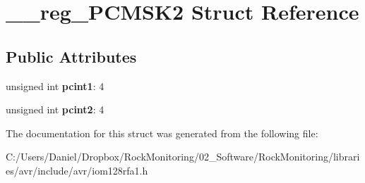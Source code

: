 \hypertarget{struct____reg___p_c_m_s_k2}{}\section{\+\_\+\+\_\+reg\+\_\+\+P\+C\+M\+S\+K2 Struct Reference}
\label{struct____reg___p_c_m_s_k2}
\subsection*{Public Attributes}
\begin{DoxyCompactItemize}
\item 
unsigned int {\bfseries pcint1}\+: 4\hypertarget{struct____reg___p_c_m_s_k2_a2aab5613925bbfc74c45b22c63a7af15}{}\label{struct____reg___p_c_m_s_k2_a2aab5613925bbfc74c45b22c63a7af15}

\item 
unsigned int {\bfseries pcint2}\+: 4\hypertarget{struct____reg___p_c_m_s_k2_a35082f06d4167ac8eb1e24d15d91a3f5}{}\label{struct____reg___p_c_m_s_k2_a35082f06d4167ac8eb1e24d15d91a3f5}

\end{DoxyCompactItemize}


The documentation for this struct was generated from the following file\+:\begin{DoxyCompactItemize}
\item 
C\+:/\+Users/\+Daniel/\+Dropbox/\+Rock\+Monitoring/02\+\_\+\+Software/\+Rock\+Monitoring/libraries/avr/include/avr/iom128rfa1.\+h\end{DoxyCompactItemize}
